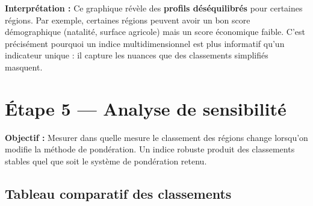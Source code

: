 \documentclass[
]{article}
\begin{document}
\textbf{Interprétation :} Ce graphique révèle des \textbf{profils
déséquilibrés} pour certaines régions. Par exemple, certaines régions
peuvent avoir un bon score démographique (natalité, surface agricole)
mais un score économique faible. C'est précisément pourquoi un indice
multidimensionnel est plus informatif qu'un indicateur unique : il
capture les nuances que des classements simplifiés masquent.

\newpage

\section{Étape 5 --- Analyse de
sensibilité}\label{uxe9tape-5-analyse-de-sensibilituxe9}

\textbf{Objectif :} Mesurer dans quelle mesure le classement des régions
change lorsqu'on modifie la méthode de pondération. Un indice robuste
produit des classements stables quel que soit le système de pondération
retenu.

\subsection{Tableau comparatif des
classements}\label{tableau-comparatif-des-classements}
\end{document}
